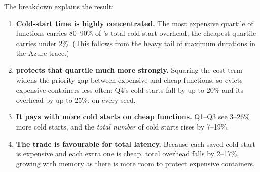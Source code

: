 \documentclass[11pt,a4paper]{article}
\newcommand{\gd}{\text{GD}}
\newcommand{\gdw}{\text{GD-W}}
\begin{document}
\begin{table}[H]
\centering
\caption{\gdw{} versus \gd{} per cost quartile (mean over three seeds). ``Share'' is the
quartile's fraction of \gd{}'s total cold-start overhead.}
\label{tab:mechanism}
\small
{}
\end{table}

The breakdown explains the result:
\begin{enumerate}
  \item \textbf{Cold-start time is highly concentrated.} The most expensive quartile of
        functions carries 80--90\% of \gd{}'s total cold-start overhead; the cheapest quartile
        carries under 2\%. (This follows from the heavy tail of maximum durations in the
        Azure trace.)
  \item \textbf{\gdw{} protects that quartile much more strongly.} Squaring the cost term
        widens the priority gap between expensive and cheap functions, so \gdw{} evicts expensive
        containers less often: Q4's cold starts fall by up to 20\% and its overhead by up to 25\%,
        on every seed.
  \item \textbf{It pays with more cold starts on cheap functions.} Q1--Q3 see 3--26\% more cold
        starts, and the \emph{total number} of cold starts rises by 7--19\%.
  \item \textbf{The trade is favourable for total latency.} Because each saved cold start is
        expensive and each extra one is cheap, total overhead falls by 2--17\%, growing with
        memory as there is more room to protect expensive containers.
\end{enumerate}
\end{document}
